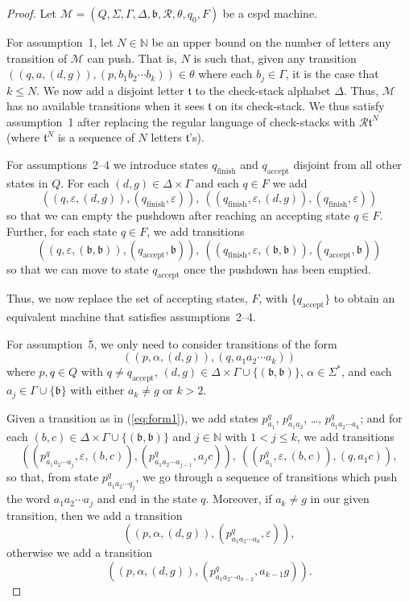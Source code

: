 \begin{proof}
	
	Let  $\mathcal{M} = (Q, \Sigma, \Gamma, \Delta, \mathfrak{b}, \mathcal{R}, \theta, q_0, F)$ be a cspd machine.
	
	For assumption~1,
	let $N \in \mathbb{N}$ be an upper bound on the number of letters any transition of $\mathcal{M}$ can push.
	That is, $N$ is such that, given any transition
	$
	(
	(q,a,(d,g)),
	(p,b_1 b_2 \cdots b_k)
	)
	\in \theta
	$
	where each $b_j \in \Gamma$, it is the case that $k \leq N$.
	We now add a disjoint letter $\mathfrak{t}$ to the check-stack alphabet $\Delta$. 
	Thus, $\mathcal{M}$ has no available transitions when it sees $\mathfrak{t}$ on its check-stack.
	We thus satisfy assumption~1
	after replacing the regular language of check-stacks with $\mathcal{R}\mathfrak{t}^N$ (where $\mathfrak{t}^N$ is a sequence of $N$ letters $\mathfrak{t}$'s).
	
	For assumptions~2--4
	we introduce states $q_\mathrm{finish}$ and $q_\mathrm{accept}$ disjoint from all other states in $Q$.
	For each $(d,g) \in \Delta \times \Gamma$ and each $q \in F$ we add
	\[
	(
	(q,\varepsilon,(d,g)),
	(q_\mathrm{finish},\varepsilon)
	),
	\ 
	(
	(q_\mathrm{finish},\varepsilon, (d,g)),
	(q_\mathrm{finish},\varepsilon)
	)
	\]
	so that we can empty the pushdown after reaching an accepting state $q\in F$.
	Further, for each state $q \in F$, we add transitions
	\[
	(
	(q,\varepsilon,(\mathfrak{b},\mathfrak{b})),
	(q_\mathrm{accept},\mathfrak{b})
	),
	\ 
	(
	(q_\mathrm{finish},\varepsilon, (\mathfrak{b},\mathfrak{b})),
	(q_\mathrm{accept},\mathfrak{b})
	)
	\]
	so that we can move to state $q_\mathrm{accept}$ once the pushdown has been emptied.
	
	Thus, we now replace the set of accepting states, $F$, with $\{q_\mathrm{accept}\}$ to obtain an equivalent machine that satisfies assumptions~2--4.
	
	For assumption~5, 
	we only need to consider transitions of the form
	\begin{equation}\label{eq:form1}
		(
		(p,\alpha,(d,g)),
		(q,a_1 a_2 \cdots a_k)
		)
	\end{equation}
	where $p,q \in Q$ with $q \neq q_\mathrm{accept}$, $(d,g) \in \Delta\times\Gamma\cup\{(\mathfrak{b},\mathfrak{b})\}$, $\alpha \in \Sigma^*$, and each $a_j \in \Gamma\cup \{\mathfrak{b}\}$ with either $a_k \neq g$ or $k > 2$.
	
	Given a transition as in (\ref{eq:form1}), we add states $p_{a_1}^q$, $p_{a_1 a_2}^q$, \dots, $p_{a_1 a_2 \cdots a_k}^q$; and
	for each $(b,c) \in \Delta\times\Gamma\cup\{(\mathfrak{b},\mathfrak{b})\}$ and $j\in \mathbb{N}$ with $1 < j \leq k$, we add transitions
	\[
	(
	(p^q_{a_1 a_2 \cdots a_j},\varepsilon,(b,c)),
	(p^q_{a_1 a_2 \cdots a_{j-1}},a_{j}c)
	),
	\ 
	(
	(p^q_{a_1},\varepsilon,(b,c)),
	(q,a_{1}c)
	),
	\]
	so that, from state $p^q_{a_1 a_2 \cdots q_j}$, we go through a sequence of transitions which push the word $a_1 a_2 \cdots a_j$ and end in the state $q$.
	Moreover, if $a_k \neq g$ in our given transition, then we add a transition
	\[
	(
	(p,\alpha, (d,g)),
	(p^q_{a_1a_2\cdots a_k}, \varepsilon)
	),
	\]
	otherwise we add a transition
	\[
	(
	(p,\alpha, (d,g)),
	(p^q_{a_1a_2\cdots a_{k-2}}, a_{k-1} g)
	).
	\]
	

\end{proof}
